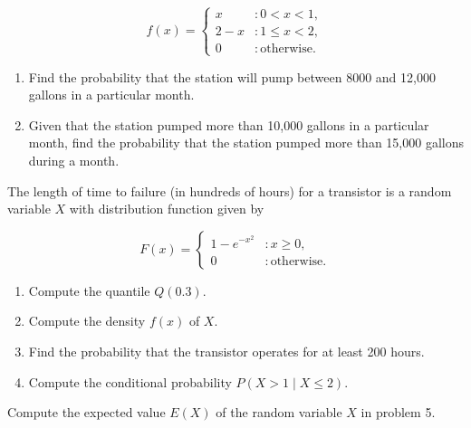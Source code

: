 \documentclass[12pt,reqno]{amsart}
\begin{document}
	\[
	f(x) = \begin{cases}
	x & : 0 < x < 1, \\
	2-x & : 1 \leq x < 2, \\
	0 & : \text{otherwise}.
	\end{cases}
	\]

\medskip
\begin{enumerate}
\item Find the probability that the station will pump between 8000 and 12,000 gallons in a particular month.\vfill
\item Given that the station pumped more than 10,000 gallons in a particular month, find the probability that the station pumped more than 15,000 gallons during a month.\vfill
\end{enumerate}









\newpage
\prob The length of time to failure (in hundreds of hours) for a transistor is a random variable $X$ with
distribution function given by

	\[
	F(x) = \begin{cases}
	1 - e^{-x^2} & : x\geq 0, \\
	0 & : \text{otherwise}.
	\end{cases}
	\]

\medskip
\begin{enumerate}
\item Compute the quantile $Q(0.3)$.\vfill
\item Compute the density $f(x)$ of $X$.\vfill
\item Find the probability that the transistor operates for at least 200 hours.\vfill
\item Compute the conditional probability $P(X>1 \mid X\leq 2)$.\vfill
\end{enumerate}



















\bigskip
\prob Compute the expected value $E(X)$ of the random variable $X$ in problem 5.\vfill
\end{document}
